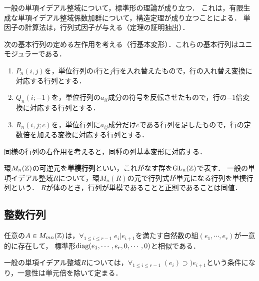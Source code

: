 \documentclass[uplatex,dvipdfmx]{jsreport}
\begin{document}
\begin{tcolorbox}[colframe=ForestGreen, colback=ForestGreen!10!white,breakable,colbacktitle=ForestGreen!40!white,coltitle=black,fonttitle=\bfseries\sffamily,
title=]
    一般の単項イデアル整域について，標準形の理論が成り立つ．
    これは，有限生成な単項イデアル整域係数加群について，構造定理が成り立つことによる．
    単因子の計算法は，行列式因子が与える（定理の証明抽出）．
\end{tcolorbox}

\begin{notation}
    次の基本行列の定める左作用を考える（行基本変形）．これらの基本行列はユニモジュラーである．
    \begin{enumerate}
        \item $P_n(i,j)$を，単位行列の$i$行と$j$行を入れ替えたもので，行の入れ替え変換に対応する行列とする．
        \item $Q_n(i;-1)$を，単位行列の$a_{ii}$成分の符号を反転させたもので，行の$-1$倍変換に対応する行列とする．
        \item $R_n(i,j;c)$を，単位行列に$a_{ij}$成分だけ$c$である行列を足したもので，行の定数倍を加える変換に対応する行列とする．
    \end{enumerate}
    同様の行列の右作用を考えると，同種の列基本変形に対応する．
\end{notation}

\begin{definition}[unimodular]
    環$M_n(\mathbb{Z})$の可逆元を\textbf{単模行列}といい，これがなす群を$\mathrm{GL}_n(\mathbb{Z})$で表す．
    一般の単項イデアル整域$R$について，環$M_n(R)$の元で行列式が単元になる行列を単模行列という．
    $R$が体のとき，行列が単模であることと正則であることは同値．
\end{definition}

\subsection{整数行列}

\begin{theorem}
    任意の$A\in M_{mn}(\mathbb{Z})$は，$\forall_{1\le i\le r-1}\;e_i|e_{i+1}$を満たす自然数の組$(e_1,\cdots,e_r)$が一意的に存在して，
    標準形$\mathrm{diag}(e_1,\cdots,e_r,0,\cdots,0)$と相似である．
\end{theorem}
\begin{remark}
    一般の単項イデアル整域$R$については，$\forall_{1\le i\le r-1}\;(e_i)\supset)e_{i+1}$という条件になり，一意性は単元倍を除いて定まる．
\end{remark}
\end{document}
